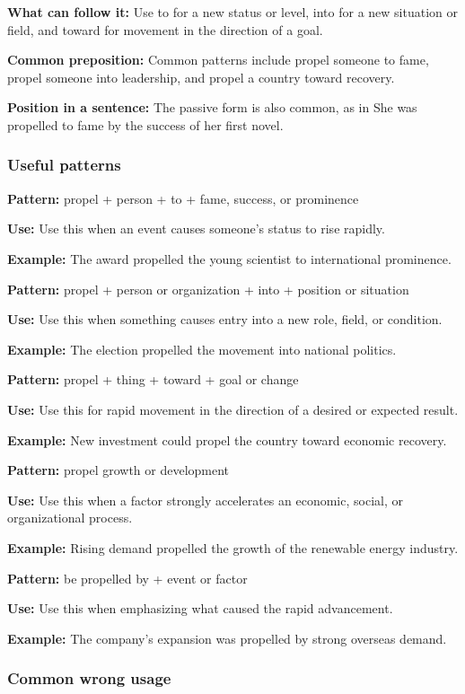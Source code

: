 \documentclass[11pt]{article}
\begin{document}
\textbf{What can follow it:} Use to for a new status or level, into for a new situation or field, and toward for movement in the direction of a goal.

\textbf{Common preposition:} Common patterns include propel someone to fame, propel someone into leadership, and propel a country toward recovery.

\textbf{Position in a sentence:} The passive form is also common, as in She was propelled to fame by the success of her first novel.

\subsubsection{Useful patterns}
\textbf{Pattern:} propel + person + to + fame, success, or prominence

\textbf{Use:} Use this when an event causes someone's status to rise rapidly.

\textbf{Example:} The award propelled the young scientist to international prominence.

\textbf{Pattern:} propel + person or organization + into + position or situation

\textbf{Use:} Use this when something causes entry into a new role, field, or condition.

\textbf{Example:} The election propelled the movement into national politics.

\textbf{Pattern:} propel + thing + toward + goal or change

\textbf{Use:} Use this for rapid movement in the direction of a desired or expected result.

\textbf{Example:} New investment could propel the country toward economic recovery.

\textbf{Pattern:} propel growth or development

\textbf{Use:} Use this when a factor strongly accelerates an economic, social, or organizational process.

\textbf{Example:} Rising demand propelled the growth of the renewable energy industry.

\textbf{Pattern:} be propelled by + event or factor

\textbf{Use:} Use this when emphasizing what caused the rapid advancement.

\textbf{Example:} The company's expansion was propelled by strong overseas demand.

\subsubsection{Common wrong usage}
\end{document}

